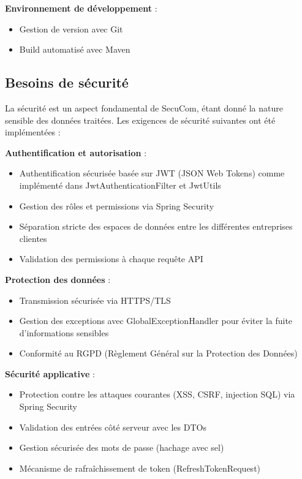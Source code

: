 \documentclass[12pt,a4paper]{report}
\begin{document}
\textbf{Environnement de développement} :
\begin{itemize}
  \item Gestion de version avec Git
  \item Build automatisé avec Maven
\end{itemize}

\subsection{Besoins de sécurité}

La sécurité est un aspect fondamental de SecuCom, étant donné la nature sensible des données traitées. Les exigences de sécurité suivantes ont été implémentées :

\textbf{Authentification et autorisation} :
\begin{itemize}
  \item Authentification sécurisée basée sur JWT (JSON Web Tokens) comme implémenté dans JwtAuthenticationFilter et JwtUtils
  \item Gestion des rôles et permissions via Spring Security
  \item Séparation stricte des espaces de données entre les différentes entreprises clientes
  \item Validation des permissions à chaque requête API
\end{itemize}

\textbf{Protection des données} :
\begin{itemize}
  \item Transmission sécurisée via HTTPS/TLS
  \item Gestion des exceptions avec GlobalExceptionHandler pour éviter la fuite d'informations sensibles
  \item Conformité au RGPD (Règlement Général sur la Protection des Données)
\end{itemize}

\textbf{Sécurité applicative} :
\begin{itemize}
  \item Protection contre les attaques courantes (XSS, CSRF, injection SQL) via Spring Security
  \item Validation des entrées côté serveur avec les DTOs
  \item Gestion sécurisée des mots de passe (hachage avec sel)
  \item Mécanisme de rafraîchissement de token (RefreshTokenRequest)
\end{itemize}
\end{document}
